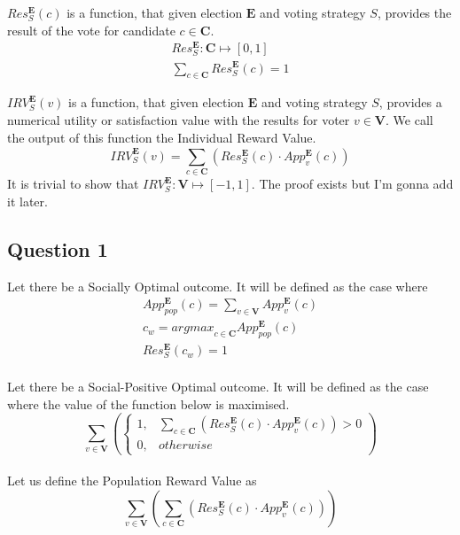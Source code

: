 \documentclass{article}
\begin{document}
$Res^{\boldsymbol{E}}_{S}(c)$ is a function, that given election $\boldsymbol{E}$ and voting strategy $S$, provides the result of the vote for candidate $c \in \boldsymbol{C}$.
\begin{gather}
Res^{\boldsymbol{E}}_{S} : \boldsymbol{C} \mapsto [0,1]\\
\sum^{}_{c \in \boldsymbol{C}}{Res^{\boldsymbol{E}}_{S}(c)} = 1
\end{gather}

${IRV}^{\boldsymbol{E}}_{S}(v)$ is a function, that given election $\boldsymbol{E}$ and voting strategy $S$, provides a numerical utility or satisfaction value with the results for voter $v \in \boldsymbol{V}$. We call the output of this function the Individual Reward Value.
\begin{equation}
{IRV}^{\boldsymbol{E}}_{S}(v) = \sum^{}_{c \in \boldsymbol{C}}{(Res^{\boldsymbol{E}}_{S}(c) \cdot App^{\boldsymbol{E}}_{v}(c))}
\end{equation}
It is trivial to show that ${IRV}^{\boldsymbol{E}}_{S} : \boldsymbol{V} \mapsto [-1,1]$. The proof exists but I'm gonna add it later.


\subsection{Question 1}

Let there be a Socially Optimal outcome. It will be defined as the case where
\begin{gather}
App^{\boldsymbol{E}}_{pop}(c) = \sum^{}_{v \in \boldsymbol{V}}{App^{\boldsymbol{E}}_{v}(c)}\\
c_{w} = {argmax}_{c \in \boldsymbol{C}} App^{\boldsymbol{E}}_{pop}(c)\\
Res^{\boldsymbol{E}}_{S}(c_{w}) = 1
\end{gather}\\

Let there be a Social-Positive Optimal outcome. It will be defined as the case where the value of the function below is maximised.
\begin{equation}
\sum^{}_{v \in \boldsymbol{V}}{\left(
\begin{cases}
1, & \sum^{}_{c \in \boldsymbol{C}}{(Res^{\boldsymbol{E}}_{S}(c) \cdot App^{\boldsymbol{E}}_{v}(c))} > 0\\
0, & {otherwise}
\end{cases}
\right)}
\end{equation}\\

Let us define the Population Reward Value as
\begin{equation}
\sum^{}_{v \in \boldsymbol{V}}{\left(
\sum^{}_{c \in \boldsymbol{C}}{\left(
Res^{\boldsymbol{E}}_{S}(c) \cdot App^{\boldsymbol{E}}_{v}(c)
\right)}
\right)}
\end{equation}\\
\end{document}
